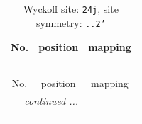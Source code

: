 \documentclass[fleqn,8pt]{jsarticle}
\begin{document}
\renewcommand{\arraystretch}{1.2}
\begin{longtable}{ccc}
\caption{Wyckoff site: {\tt 24j}, site symmetry: {\tt ..2'}}
 \\
 \hline \hline
No. & position & mapping \\ \hline \endfirsthead

\multicolumn{2}{l}{\tablename\ \thetable{}} \\
 \hline \hline
No. & position & mapping \\ \hline \endhead

 \hline \hline
\multicolumn{2}{r}{\footnotesize\it continued ...} \\ \endfoot

 \hline \hline
\multicolumn{2}{r}{} \\ \endlastfoot


\end{longtable}
\end{document}
